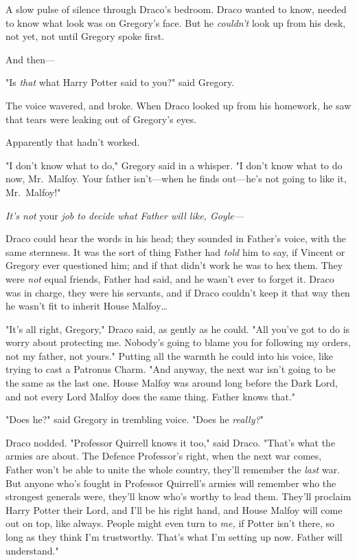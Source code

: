 A slow pulse of silence through Draco's bedroom. Draco wanted to know, needed
to know what look was on Gregory's face. But he \emph{couldn't} look up from
his desk, not yet, not until Gregory spoke first.

And then---

"Is \emph{that} what Harry Potter said to you?" said Gregory.

The voice wavered, and broke. When Draco looked up from his homework, he saw
that tears were leaking out of Gregory's eyes.

Apparently that hadn't worked.

"I don't know what to do," Gregory said in a whisper. "I don't know what to do
now, Mr.~Malfoy. Your father isn't---when he finds out---he's not going to like
it, Mr.~Malfoy!"

\emph{It's not} your \emph{job to decide what Father will like, Goyle---}

Draco could hear the words in his head; they sounded in Father's voice, with
the same sternness. It was the sort of thing Father had \emph{told} him to say,
if Vincent or Gregory ever questioned him; and if that didn't work he was to
hex them. They were \emph{not} equal friends, Father had said, and he wasn't
ever to forget it. Draco was in charge, they were his servants, and if Draco
couldn't keep it that way then he wasn't fit to inherit House Malfoy{\ldots}

"It's all right, Gregory," Draco said, as gently as he could. "All you've got
to do is worry about protecting me. Nobody's going to blame you for following
my orders, not my father, not yours." Putting all the warmth he could into his
voice, like trying to cast a Patronus Charm. "And anyway, the next war isn't
going to be the same as the last one. House Malfoy was around long before the
Dark Lord, and not every Lord Malfoy does the same thing. Father knows that."

"Does he?" said Gregory in trembling voice. "Does he \emph{really?}"

Draco nodded. "Professor Quirrell knows it too," said Draco. "That's what the
armies are about. The Defence Professor's right, when the next war comes,
Father won't be able to unite the whole country, they'll remember the
\emph{last} war. But anyone who's fought in Professor Quirrell's armies will
remember who the strongest generals were, they'll know who's worthy to lead
them. They'll proclaim Harry Potter their Lord, and I'll be his right hand, and
House Malfoy will come out on top, like always. People might even turn to
\emph{me,} if Potter isn't there, so long as they think I'm trustworthy. That's
what I'm setting up now. Father will understand."

